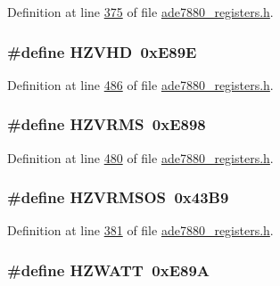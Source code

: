 Definition at line \hyperlink{a00036_source_l00375}{375} of file \hyperlink{a00036_source}{ade7880\-\_\-registers.\-h}.

\hypertarget{a00036_a040a97dd095f5e8991d153c16e4ed4ff}{
\subsubsection[{H\-Z\-V\-H\-D}]{\setlength{\rightskip}{0pt plus 5cm}\#define H\-Z\-V\-H\-D~0x\-E89\-E}}\label{de/d8c/a00036_a040a97dd095f5e8991d153c16e4ed4ff}


Definition at line \hyperlink{a00036_source_l00486}{486} of file \hyperlink{a00036_source}{ade7880\-\_\-registers.\-h}.

\hypertarget{a00036_a128b260b91bf7bf1970f9e26c4866958}{
\subsubsection[{H\-Z\-V\-R\-M\-S}]{\setlength{\rightskip}{0pt plus 5cm}\#define H\-Z\-V\-R\-M\-S~0x\-E898}}\label{de/d8c/a00036_a128b260b91bf7bf1970f9e26c4866958}


Definition at line \hyperlink{a00036_source_l00480}{480} of file \hyperlink{a00036_source}{ade7880\-\_\-registers.\-h}.

\hypertarget{a00036_afc76ca3b28d691349fc61030311acc53}{
\subsubsection[{H\-Z\-V\-R\-M\-S\-O\-S}]{\setlength{\rightskip}{0pt plus 5cm}\#define H\-Z\-V\-R\-M\-S\-O\-S~0x43\-B9}}\label{de/d8c/a00036_afc76ca3b28d691349fc61030311acc53}


Definition at line \hyperlink{a00036_source_l00381}{381} of file \hyperlink{a00036_source}{ade7880\-\_\-registers.\-h}.

\hypertarget{a00036_a62b2bcc794747ca4c5755a58a2b48a60}{
\subsubsection[{H\-Z\-W\-A\-T\-T}]{\setlength{\rightskip}{0pt plus 5cm}\#define H\-Z\-W\-A\-T\-T~0x\-E89\-A}}\label{de/d8c/a00036_a62b2bcc794747ca4c5755a58a2b48a60}


